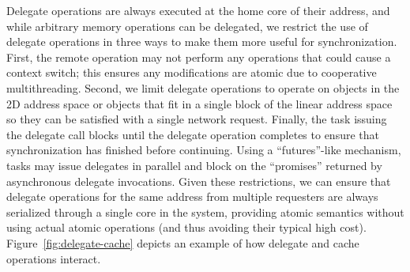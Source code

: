 Delegate operations are always executed at the home core of their
address, and while arbitrary memory operations can be delegated, we
restrict the use of delegate operations in three ways to make them more
useful for synchronization.
First, the remote operation may not perform any operations that could cause a context switch; this ensures any modifications are atomic due to cooperative multithreading.
Second, we limit delegate operations to operate on objects in
the 2D address space or objects that fit in a single block of the linear
address space so they can be satisfied with a single network request.
Finally, the task issuing the delegate call blocks until the delegate operation
completes to ensure that synchronization has finished before continuing.
Using a ``futures''-like mechanism, tasks may issue delegates in parallel and block 
on the ``promises'' returned by asynchronous delegate invocations.
Given these restrictions, we can ensure that delegate
operations for the same address from multiple requesters are always
serialized through a single core in the system, providing atomic
semantics without using actual atomic operations (and thus avoiding their typical high cost). 
Figure~\ref{fig:delegate-cache} depicts an example of how delegate and
cache operations interact.

